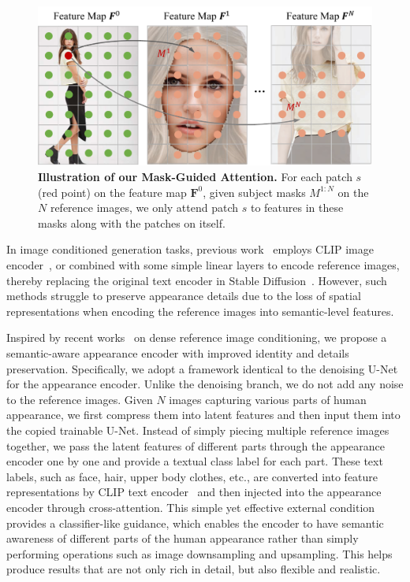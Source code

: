 \begin{figure}[!t]
\centering
\includegraphics[width=\linewidth]{figure/mask_guided.pdf}
\caption{\textbf{Illustration of our Mask-Guided Attention.} For each patch $s$ (red point) on the feature map $\bm{F}^{0}$, given subject masks $M^{1:N}$ on the $N$ reference images, we only attend patch $s$ to features in these masks along with the patches on itself.}
\label{fig:mask_guided}
\end{figure}

 In image conditioned generation tasks, previous work~\cite{ye2023ipadapter,yang2023paintbyexample,zhang2024ssrencoder} employs CLIP image encoder~\cite{radford2021clip}, or combined with some simple linear layers to encode reference images, thereby replacing the original text encoder in Stable Diffusion~\cite{rombach2022ldm}. However, such methods struggle to preserve appearance details due to the loss of spatial representations when encoding the reference images into semantic-level features.

Inspired by recent works~\cite{referenceonlycontrol,cao2023masactrl,xu2023magicanimate,hu2023animateanyone} on dense reference image conditioning, we propose a semantic-aware appearance encoder with improved identity and details preservation. Specifically, we adopt a framework identical to the denoising U-Net for the appearance encoder. Unlike the denoising branch, we do not add any noise to the reference images. Given $N$ images capturing various parts of human appearance, we first compress them into latent features and then input them into the copied trainable U-Net. Instead of simply piecing multiple reference images together, we pass the latent features of different parts through the appearance encoder one by one and provide a textual class label for each part. These text labels, such as face, hair, upper body clothes, etc., are converted into feature representations by CLIP text encoder~\cite{radford2021clip} and then injected into the appearance encoder through cross-attention. This simple yet effective external condition provides a classifier-like guidance, which enables the encoder to have semantic awareness of different parts of the human appearance rather than simply performing operations such as image downsampling and upsampling. This helps produce results that are not only rich in detail, but also flexible and realistic.


